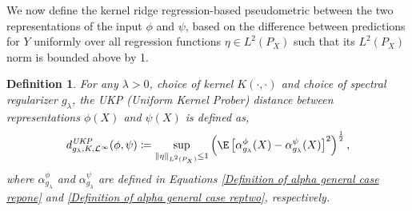 \documentclass{article} %
\newcommand{\repone}{\phi}
\newcommand{\reptwo}{\psi}
\newcommand{\gl}{g_{\lambda}}
\newcommand{\norm}[1]{\left\|#1\right\|}
\newcommand{\LPtwo}{L^{2}(P_{X})}
\newcommand{\metricstname}{UKP }
\newcommand{\metricfullname}{Uniform Kernel Prober}
\newcommand{\dopgl}{d_{\gl,K,\mathcal{L}^{\infty}}^{\emph{\metricstname}}}
\theoremstyle{plain}
\newcounter{definitionno}
\newtheorem{definition}[definitionno]{Definition}
\begin{document}
We now define the kernel ridge regression-based pseudometric between the two representations of the input $\repone$ and $\reptwo$, based on the difference between predictions for $Y$ uniformly over all regression functions $\eta \in \LPtwo$ such that its $\LPtwo$ norm is bounded above by 1.
\begin{definition}\label{Definition of pseudometric operator norm general case}
    For any $\lambda>0$, choice of kernel $K(\cdot,\cdot)$ and choice of spectral regularizer $\gl$, the \metricstname (\metricfullname) distance between representations $\repone(X)$ and $\reptwo(X)$ is defined as, 
    \[
    \dopgl(\repone,\reptwo) \coloneq \underset{\norm{\eta}_{\LPtwo} \leq 1}{\sup} \left(\E\left[\alpha_{\gl}^{\repone}(X)-\alpha_{\gl}^{\reptwo}(X)\right]^{2}\right)^{\frac{1}{2}},
    \]
    where $\alpha_{\gl}^{\repone}$ and $\alpha_{\gl}^{\reptwo}$ are defined in Equations \ref{Definition of alpha general case repone} and \ref{Definition of alpha general case reptwo}, respectively.
\end{definition}

\end{document}

